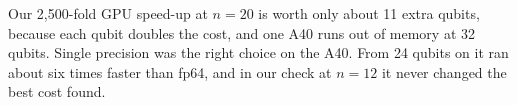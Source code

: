 
Our 2,500-fold GPU speed-up at $n = 20$ is worth only about 11 extra qubits, because each qubit doubles the cost, and one A40 runs out of memory at 32 qubits.
Single precision was the right choice on the A40.
From 24 qubits on it ran about six times faster than fp64, and in our check at $n = 12$ it never changed the best cost found.
